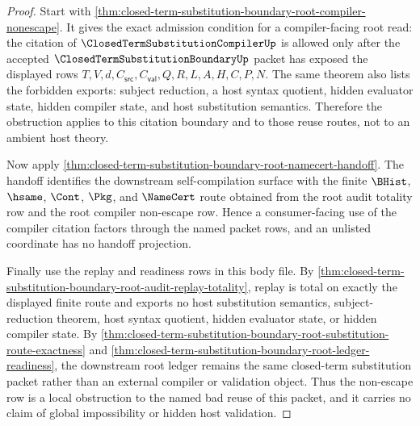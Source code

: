 \begin{proof}
Start with \autoref{thm:closed-term-substitution-boundary-root-compiler-nonescape}. It gives the exact admission condition for a compiler-facing root read: the citation of $\ClosedTermSubstitutionCompilerUp$ is allowed only after the accepted $\ClosedTermSubstitutionBoundaryUp$ packet has exposed the displayed rows $T,V,d,C_{\mathsf{src}},C_{\mathsf{val}},Q,R,L,A,H,C,P,N$. The same theorem also lists the forbidden exports: subject reduction, a host syntax quotient, hidden evaluator state, hidden compiler state, and host substitution semantics. Therefore the obstruction applies to this citation boundary and to those reuse routes, not to an ambient host theory.

Now apply \autoref{thm:closed-term-substitution-boundary-root-namecert-handoff}. The handoff identifies the downstream self-compilation surface with the finite $\BHist$, $\hsame$, $\Cont$, $\Pkg$, and $\NameCert$ route obtained from the root audit totality row and the root compiler non-escape row. Hence a consumer-facing use of the compiler citation factors through the named packet rows, and an unlisted coordinate has no handoff projection.

Finally use the replay and readiness rows in this body file. By \autoref{thm:closed-term-substitution-boundary-root-audit-replay-totality}, replay is total on exactly the displayed finite route and exports no host substitution semantics, subject-reduction theorem, host syntax quotient, hidden evaluator state, or hidden compiler state. By \autoref{thm:closed-term-substitution-boundary-root-substitution-route-exactness} and \autoref{thm:closed-term-substitution-boundary-root-ledger-readiness}, the downstream root ledger remains the same closed-term substitution packet rather than an external compiler or validation object. Thus the non-escape row is a local obstruction to the named bad reuse of this packet, and it carries no claim of global impossibility or hidden host validation.
\end{proof}
